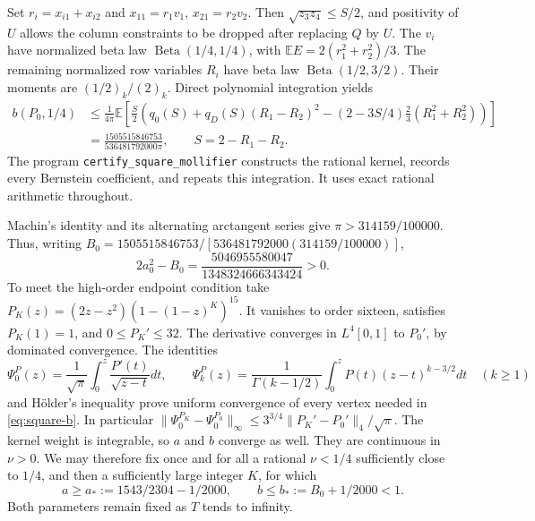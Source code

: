 Set $r_i=x_{i1}+x_{i2}$ and $x_{11}=r_1v_1$, $x_{21}=r_2v_2$.
Then $\sqrt{z_3z_4}\le S/2$, and positivity of $U$ allows the
column constraints to be dropped after replacing $Q$ by $U$.
The $v_i$ have normalized beta law $\operatorname{Beta}(1/4,1/4)$,
with $\mathbb EE=2(r_1^2+r_2^2)/3$. The remaining normalized row
variables $R_i$ have beta law $\operatorname{Beta}(1/2,3/2)$.
Their moments are $(1/2)_k/(2)_k$. Direct polynomial integration yields
\begin{align*}
 b(P_0,1/4)&\le\frac1{4\pi}\mathbb E\left[
 \frac S2\left(q_0(S)+q_D(S)(R_1-R_2)^2
 -(2-3S/4)\frac23(R_1^2+R_2^2)\right)\right]\\
 &=\frac{1505515846753}{536481792000\pi},\qquad S=2-R_1-R_2.
\end{align*}
The program \texttt{certify\_square\_mollifier} constructs the rational
kernel, records every Bernstein coefficient, and repeats this integration.
It uses exact rational arithmetic throughout.

Machin's identity and its alternating arctangent series give
$\pi>314159/100000$. Thus, writing
$B_0=1505515846753/[536481792000(314159/100000)]$,
\[
 2a_0^2-B_0=\frac{5046955580047}{1348324666343424}>0.
\]
To meet the high-order endpoint condition take
$P_K(z)=(2z-z^2)(1-(1-z)^K)^{15}$.
It vanishes to order sixteen, satisfies $P_K(1)=1$, and
$0\le P_K'\le32$. The derivative converges in $L^4[0,1]$ to
$P_0'$, by dominated convergence. The identities
\[
 \Psi_0^P(z)=\frac1{\sqrt\pi}\int_0^z\frac{P'(t)}{\sqrt{z-t}}dt,
 \qquad
 \Psi_k^P(z)=\frac1{\Gamma(k-1/2)}\int_0^zP(t)(z-t)^{k-3/2}dt
 \quad(k\ge1)
\]
and H\"older's inequality prove uniform convergence of every vertex
needed in \eqref{eq:square-b}. In particular
$\|\Psi_0^{P_K}-\Psi_0^{P_0}\|_\infty
\le3^{3/4}\|P_K'-P_0'\|_4/\sqrt\pi$.
The kernel weight is integrable, so $a$ and $b$ converge as well.
They are continuous in $\nu>0$. We may therefore fix once and for
all a rational $\nu<1/4$ sufficiently close to $1/4$, and then a
sufficiently large integer $K$, for which
\[
 a\ge a_*:=1543/2304-1/2000,\qquad
 b\le b_*:=B_0+1/2000<1.
\]
Both parameters remain fixed as $T$ tends to infinity.


